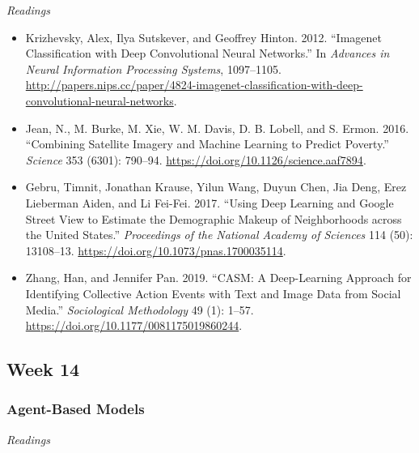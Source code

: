 \documentclass[
  10pt,
]{article}
\providecommand{\tightlist}{%
  \setlength{\itemsep}{0pt}\setlength{\parskip}{0pt}}
\begin{document}
\emph{Readings}

\begin{itemize}
\tightlist
\item
  Krizhevsky, Alex, Ilya Sutskever, and Geoffrey Hinton. 2012.
  ``Imagenet Classification with Deep Convolutional Neural Networks.''
  In \emph{Advances in Neural Information Processing Systems},
  1097--1105.
  \url{http://papers.nips.cc/paper/4824-imagenet-classification-with-deep-convolutional-neural-networks}.
\item
  Jean, N., M. Burke, M. Xie, W. M. Davis, D. B. Lobell, and S. Ermon.
  2016. ``Combining Satellite Imagery and Machine Learning to Predict
  Poverty.'' \emph{Science} 353 (6301): 790--94.
  \url{https://doi.org/10.1126/science.aaf7894}.
\item
  Gebru, Timnit, Jonathan Krause, Yilun Wang, Duyun Chen, Jia Deng, Erez
  Lieberman Aiden, and Li Fei-Fei. 2017. ``Using Deep Learning and
  Google Street View to Estimate the Demographic Makeup of Neighborhoods
  across the United States.'' \emph{Proceedings of the National Academy
  of Sciences} 114 (50): 13108--13.
  \url{https://doi.org/10.1073/pnas.1700035114}.
\item
  Zhang, Han, and Jennifer Pan. 2019. ``CASM: A Deep-Learning Approach
  for Identifying Collective Action Events with Text and Image Data from
  Social Media.'' \emph{Sociological Methodology} 49 (1): 1--57.
  \url{https://doi.org/10.1177/0081175019860244}.
\end{itemize}

\hypertarget{week-14}{%
\subsection{Week 14}\label{week-14}}

\hypertarget{agent-based-models}{%
\subsubsection{Agent-Based Models}\label{agent-based-models}}

\emph{Readings}
\end{document}
